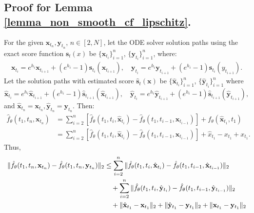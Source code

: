 \documentclass[11pt]{article}
\def\rvx{{\mathbf{x}}}
\def\rvy{{\mathbf{y}}}
\def\vs{{\bm{s}}}
\begin{document}
\subsection{Proof for Lemma \ref{lemma_non_smooth_cf_lipschitz}.} 
\label{lemma_3.6_proof}
For the given $\rvx_{t_n}, \rvy_{t_n}$, $n \in [2, N]$, let the ODE solver solution paths using the exact score function $\vs_t(x)$ be $\{\rvx_{t_i}\}_{i=1}^n$, $\{\rvy_{t_i}\}_{i=1}^n$, where:
\begin{align}
\label{xy_evolve}
\rvx_{t_i} = e^{h_i} \rvx_{t_{i+1}} + (e^{h_i} - 1) \vs_{t_i}(\rvx_{t_{i+1}}), \quad
\rvy_{t_i} = e^{h_i} \rvy_{t_{i+1}} + (e^{h_i} - 1) \vs_{t_i}(y_{t_{i+1}}).
\end{align}
Let the solution paths with estimated score $\hat{\vs}_t(\rvx)$ be $\{\hat{\rvx}_{t_i}\}_{i=1}^n$, $\{\hat{\rvy}_{t_i}\}_{i=1}^n$ where
\[
\hat{\rvx}_{t_i} = e^{h_i} \hat{\rvx}_{t_{i+1}} + (e^{h_i} - 1) \hat{\vs}_{ t_{i+1}}(\hat{\rvx}_{t_{i+1}}), \quad
\hat{\rvy}_{t_i} = e^{h_i} \hat{\rvy}_{t_{i+1}} + (e^{h_i} - 1) \hat{\vs}_{t_{i+1}}(\hat{\rvy}_{t_{i+1}}),
\]
and $\hat{\rvx}_{t_n} = \rvx_{t_n}, \hat{\rvy}_{t_n} = \rvy_{t_n}$. Then:
\begin{align*}
\hat{f}_\theta(t_1, t_n, \rvx_{t_n}) &= \sum_{i=2}^n \left[\hat{f}_\theta(t_1, t_i, \hat{\rvx}_{t_i} ) - \hat{f}_\theta(t_1, t_{i-1}, \hat{\rvx}_{t_{i-1}})\right] + f_\theta(\hat{\rvx}_{t_1}, t_1) \\
&= \sum_{i=2}^n \left[\hat{f}_\theta(t_1, t_i, \hat{\rvx}_{t_i} ) - \hat{f}_\theta(t_1, t_{i-1}, \hat{\rvx}_{t_{i-1}})\right] + \hat{x}_{t_1} - x_{t_1} + x_{t_1}.
\end{align*}
Thus,
\begin{align*}
\|\hat{f}_\theta(t_1, t_n, \rvx_{t_n}) - \hat{f}_\theta(t_1, t_n, \rvy_{t_n})\|_2 
&\leq \sum_{i=2}^n \|\hat{f}_\theta(t_1, t_i, \hat{\rvx}_{t_i} ) - \hat{f}_\theta(t_1, t_{i-1}, \hat{\rvx}_{t_{i-1}})\|_2 \notag \\ & \quad + \sum_{i=2}^n \|\hat{f}_\theta(t_1, t_i, \hat{\rvy}_{t_i} ) - \hat{f}_\theta(t_1, t_{i-1}, \hat{\rvy}_{t_{i-1}})\|_2 \notag \\
&\quad + \|{\hat{\rvx}_{t_1} - \rvx_{t_1}}\|_2 + \|{\hat{\rvy}_{t_1} - \rvy_{t_1}}\|_2 + \|{\rvx_{t_1} - \rvy_{t_1}}\|_2
\end{align*}
\end{document}
